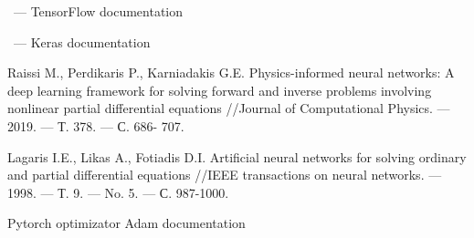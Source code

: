 \begin{thebibliography}{}

~---
TensorFlow documentation

~---
Keras documentation

\link{}
Raissi M., Perdikaris P., Karniadakis G.E. Physics-informed neural networks: A deep
learning framework for solving forward and inverse problems involving nonlinear partial
differential equations //Journal of Computational Physics. — 2019. — Т. 378. — С. 686-
707.

\link{}
Lagaris I.E., Likas A., Fotiadis D.I. Artificial neural networks for solving ordinary and
partial differential equations //IEEE transactions on neural networks. — 1998. — Т. 9. —
No. 5. — С. 987-1000.


Pytorch optimizator Adam documentation


\end{thebibliography}
